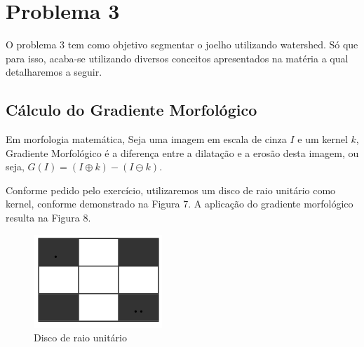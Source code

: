 \documentclass{article}
\begin{document}
	
	\section{Problema 3}	
	
	O problema 3 tem como objetivo segmentar o joelho utilizando watershed. Só que para isso, acaba-se utilizando diversos conceitos apresentados na matéria a qual detalharemos a seguir.
	
	\subsection{Cálculo do Gradiente Morfológico}	
	
	Em morfologia matemática, Seja uma imagem em escala de cinza $I$ e um kernel $k$, Gradiente Morfológico é a diferença entre a dilatação e a erosão desta imagem, ou seja, $G(I) = (I \oplus k) - (I \ominus k)$.
	
	Conforme pedido pelo exercício, utilizaremos um disco de raio unitário como kernel, conforme demonstrado na Figura 7. 
	A aplicação do gradiente morfológico resulta na Figura 8.
	
	\begin{figure}[H]
		\centering
		\includegraphics[scale=0.4]{images/3_disco.png}
		\caption{Disco de raio unitário} 
		
	\end{figure}
	
\end{document}
